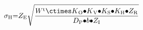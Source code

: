 \[{\sigma }_{\mathrm{H}}\mathrm{=}Z_{\mathrm{E}}\sqrt{\frac{W^{\mathrm{t}}{\mathrm{\ctimes }K}_{\mathrm{O}}{\mathrm{\bullet }K}_{\mathrm{V}}\mathrm{\bullet }K_{\mathrm{S}}\mathrm{\bullet }K_{\mathrm{H}}\mathrm{\bullet }Z_{\mathrm{R}}}{D_{\mathrm{P}}\mathrm{\bullet }b\mathrm{\bullet }Z_{\mathrm{I}}}}\] 